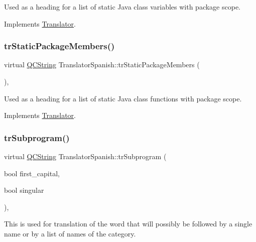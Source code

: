 Used as a heading for a list of static Java class variables with package scope. 

Implements \mbox{\hyperlink{class_translator}{Translator}}.

\mbox{\label{class_translator_spanish_a7ffff8dbfd1159ed865c9ca7c4367e3b}} 
\subsubsection{\texorpdfstring{trStaticPackageMembers()}{trStaticPackageMembers()}}
{\footnotesize\ttfamily virtual \mbox{\hyperlink{class_q_c_string}{Q\+C\+String}} Translator\+Spanish\+::tr\+Static\+Package\+Members (\begin{DoxyParamCaption}{ }\end{DoxyParamCaption})\hspace{0.3cm}{\ttfamily [inline]}, {\ttfamily [virtual]}}

Used as a heading for a list of static Java class functions with package scope. 

Implements \mbox{\hyperlink{class_translator}{Translator}}.

\mbox{\label{class_translator_spanish_a0bc9727d19dc8649eae3efb1c25be841}} 
\subsubsection{\texorpdfstring{trSubprogram()}{trSubprogram()}}
{\footnotesize\ttfamily virtual \mbox{\hyperlink{class_q_c_string}{Q\+C\+String}} Translator\+Spanish\+::tr\+Subprogram (\begin{DoxyParamCaption}\item[{bool}]{first\+\_\+capital,  }\item[{bool}]{singular }\end{DoxyParamCaption})\hspace{0.3cm}{\ttfamily [inline]}, {\ttfamily [virtual]}}

This is used for translation of the word that will possibly be followed by a single name or by a list of names of the category. 

